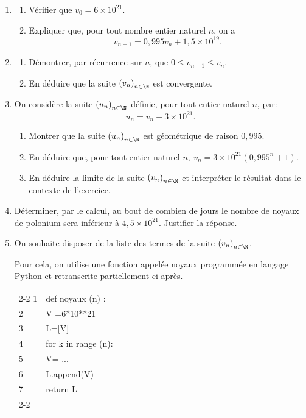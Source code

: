 \begin{enumerate}
\item 
	\begin{enumerate}
		\item Vérifier que $v_0 = 6\times 10^{21}$.
		\item Expliquer que, pour tout nombre entier naturel $n$, on a 
		\[v_{n+1} = 0,995v_n + 1,5 \times  10^{19}.\]
	\end{enumerate}
\item 
	\begin{enumerate}
		\item Démontrer, par récurrence sur $n$, que $0 \leqslant v_{n+1}  \leqslant v_n$.
		\item En déduire que la suite $\left(v_n\right)_{n\in \N}$ est convergente.
	\end{enumerate}
\item On considère la suite $\left(u_n\right)_{n \in \N}$ définie, pour tout entier naturel $n$, par: \[u_n = v_n - 3 \times 10^{21}.\]
	\begin{enumerate}
		\item Montrer que la suite $\left(u_n\right)_{n \in \N}$ est géométrique de raison $0,995$.
		\item En déduire que, pour tout entier naturel $n,\: v_n = 3 \times 10^{21}\left(0,995^n + 1\right)$.
		\item En déduire la limite de la suite $\left(v_n\right)_{n \in \N}$ et interpréter le résultat dans le contexte de l'exercice.
	\end{enumerate}
\item Déterminer, par le calcul, au bout de combien de jours le nombre de noyaux de polonium sera inférieur à $4,5 \times 10^{21}$. Justifier la réponse.
\item On souhaite disposer de la liste des termes de la suite $\left(v_n\right)_{n \in \N}$. 

Pour cela, on utilise une fonction appelée noyaux programmée en langage Python et retranscrite partiellement ci-après.

\begin{center}
\begin{tabular}{l |l|}\cline{2-2}
1 &def noyaux (n) :\\
2 &\qquad V =6*10**21\\
3&\qquad L=[V]\\
4&\qquad for k in range (n):\\
5&\qquad \qquad V= ...\\
6&\qquad \qquad L.append(V)\\
7&\qquad return L\\ \cline{2-2}
\end{tabular}
\end{center}


\end{enumerate}
